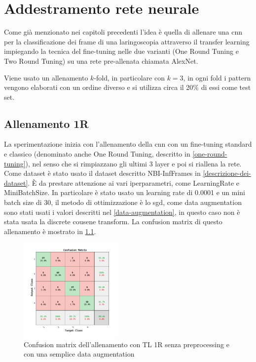 \chapter{Addestramento rete neurale}\label{addestramento-rete-neurale}


Come già menzionato nei capitoli precedenti l’idea è quella di allenare una \gls{cnn} per la classificazione dei frame di una laringoscopia attraverso il transfer learning impiegando la tecnica del
fine-tuning nelle due varianti (One Round Tuning e Two Round Tuning)  su una rete pre-allenata chiamata AlexNet.


Viene usato un allenamento \(k\)-fold, in particolare con \(k=3\), in ogni fold i  pattern vengono elaborati con un
ordine diverso e si utilizza circa il 20\% di essi come test set.


\section{Allenamento 1R}\label{allenamento-1r}

La sperimentazione inizia con l'allenamento della \gls{cnn} con un fine-tuning standard e classico (denominato anche One Round Tuning, descritto in \cref{one-round-tuning}), nel senso che si rimpiazzano gli ultimi 3 layer e poi si riallena la rete. Come dataset è stato usato il dataset descritto NBI-InfFrames in \cref{descrizione-dei-dataset}. È da prestare attenzione ai vari iperparametri, come \Gls{LearningRate} e \Gls{MiniBatchSize}. In particolare è stato usato un learning rate di 0.0001 e un mini batch size di 30, il metodo di ottimizzazione è lo \gls{sgd}, come data augmentation sono stati usati i valori descritti nel \cref{data-augmentation}, in questo caso non è stata usata la discrete cousene transform. La confusion matrix di questo allenamento è mostrato in \cref{fig:result-one-liscio}.


\begin{figure}[ht]
    \centering
    \includegraphics[width=0.45\textwidth]{addestramento-rete-neurale/one-liscio.pdf}
    \caption{Confusion matrix dell'allenamento con TL 1R senza preprocessing e con una semplice data augmentation}
    \label{fig:result-one-liscio}
\end{figure}

